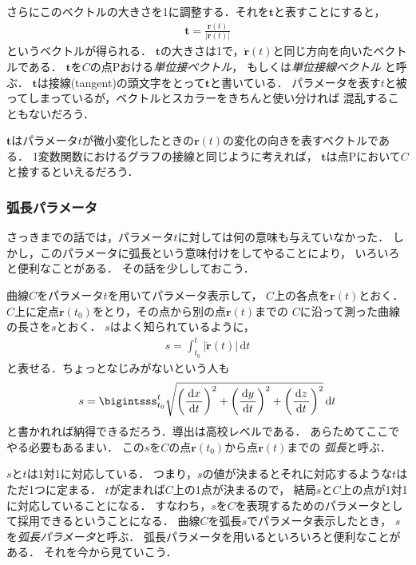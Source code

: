 さらにこのベクトルの大きさを1に調整する．それを$\bm{t}$と表すことにすると，
\begin{align}
\bm{t} = \frac { \dot{ \bm{r} } (t) } { \lvert \dot{ \bm{r} } (t) \rvert }
\end{align}
というベクトルが得られる．
$\bm{t}$の大きさは1で，$\dot{\bm{r}}(t)$と同じ方向を向いたベクトルである．
$\bm{t}$を$C$の点Pおける\emph{単位接ベクトル}，
もしくは\emph{単位接線ベクトル}
と呼ぶ．
$\bm{t}$は接線(tangent)の頭文字をとって$\bm{t}$と書いている．
パラメータを表す$t$と被ってしまっているが，ベクトルとスカラーをきちんと使い分ければ
混乱することもないだろう．

$\bm{t}$はパラメータ$t$が微小変化したときの$\bm{r}(t)$の変化の向きを表すベクトルである．
1変数関数におけるグラフの接線と同じように考えれば，
$\bm{t}$は点Pにおいて$C$と接するといえるだろう．

\subsubsection{弧長パラメータ}
さっきまでの話では，パラメータ$t$に対しては何の意味も与えていなかった．
しかし，このパラメータに弧長という意味付けをしてやることにより，
いろいろと便利なことがある．
その話を少ししておこう．

曲線$C$をパラメータ$t$を用いてパラメータ表示して，
$C$上の各点を$\bm{r}(t)$とおく．$C$上に定点$\bm{r}(t_0)$をとり，その点から別の点$\bm{r}(t)$までの
$C$に沿って測った曲線の長さを$s$とおく．
$s$はよく知られているように，
\begin{align}
s = \int _{t_0}^t \lvert \dot{ \bm{r} } (t) \rvert \, \mathrm{d} t
\label{eq:kotyou1} 
\end{align}
と表せる．ちょっとなじみがないという人も
\begin{align}
s = \bigintsss _{t_0}^t \sqrt{ \left( \frac{ \mathrm{d} x }{\mathrm{d} t} \right)^2
+ \left( \frac{ \mathrm{d} y } {\mathrm{d} t} \right)^2 
+ \left( \frac{ \mathrm{d} z } {\mathrm{d} t} \right)^2}  \, \mathrm{d} t
\label{eq:kotyou2} 
\end{align}
と書かれれば納得できるだろう．導出は高校レベルである．
あらためてここでやる必要もあるまい．
この$s$を$C$の点$\bm{r}(t_0)$から点$\bm{r}(t)$までの
\emph{弧長}と呼ぶ．

$s$と$t$は1対1に対応している．
つまり，$s$の値が決まるとそれに対応するような$t$はただ1つに定まる．
$t$が定まれば$C$上の1点が決まるので，
結局$s$と$C$上の点が1対1に対応していることになる．
すなわち，$s$を$C$を表現するためのパラメータとして採用できるということになる．
曲線$C$を弧長$s$でパラメータ表示したとき，
$s$を\emph{弧長パラメータ}と呼ぶ．
弧長パラメータを用いるといろいろと便利なことがある．
それを今から見ていこう．

